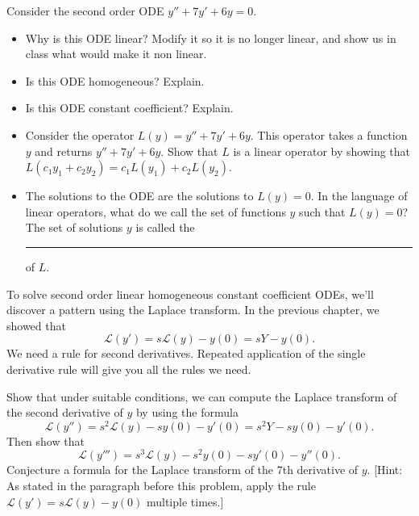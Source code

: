 \begin{problem}
 Consider the second order ODE $y''+7y'+6y=0$.  
\begin{itemize}
 \item Why is this ODE linear?  Modify it so it is no longer linear, and show us in class what would make it non linear.
 \item Is this ODE homogeneous?  Explain.
 \item Is this ODE constant coefficient? Explain.
 \item 
{}%
Consider the operator $L(y) = y''+7y'+6y$. This operator takes a function $y$ and returns $y''+7y'+6y$. 
   Show that $L$ is a linear operator by showing that $L(c_1y_1+c_2y_2)=c_1L(y_1)+c_2L(y_2)$. 
 \item
{}%
 The solutions to the ODE are the solutions to $L(y)=0$.  In the language of linear operators, what do we call the set of functions $y$ such that $L(y)=0$? The set of solutions $y$ is called the \rule{1in}{.5pt} of $L$. 
\end{itemize}
\end{problem}




















To solve second order linear homogeneous constant coefficient ODEs, we'll discover a pattern using the Laplace transform. In the previous chapter, we showed that 
$$\mathscr{L}(y') = s\mathscr{L}(y)-y(0) = sY-y(0).$$
We need a rule for second derivatives. Repeated application of the single derivative rule will give you all the rules we need. 

\begin{problem}
 Show that under suitable conditions, we can compute the Laplace transform of the second derivative of $y$ by using the formula
 $$\mathscr{L}(y'')=s^2\mathscr{L}(y)-sy(0)-y'(0) = s^2Y-sy(0)-y'(0).$$
 Then show that 
 $$\mathscr{L}(y''')=s^3\mathscr{L}(y)-s^2y(0)-sy'(0)-y''(0).$$
 Conjecture a formula for the Laplace transform of the 7th derivative of $y$.
 [Hint: As stated in the paragraph before this problem, apply the rule $\mathscr{L}(y') = s\mathscr{L}(y)-y(0)$ multiple times.]
\end{problem}


















